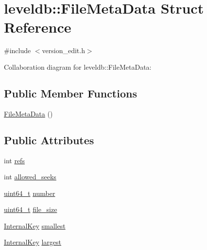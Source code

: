 \hypertarget{structleveldb_1_1_file_meta_data}{\section{leveldb\-:\-:File\-Meta\-Data Struct Reference}
\label{structleveldb_1_1_file_meta_data}
}


{\ttfamily \#include $<$version\-\_\-edit.\-h$>$}



Collaboration diagram for leveldb\-:\-:File\-Meta\-Data\-:
\subsection*{Public Member Functions}
\begin{DoxyCompactItemize}
\item 
\hyperlink{structleveldb_1_1_file_meta_data_ab809d499cd560df58cc5c529bb69980a}{File\-Meta\-Data} ()
\end{DoxyCompactItemize}
\subsection*{Public Attributes}
\begin{DoxyCompactItemize}
\item 
int \hyperlink{structleveldb_1_1_file_meta_data_a199e4ba2167c8facad8bd41269982935}{refs}
\item 
int \hyperlink{structleveldb_1_1_file_meta_data_a63f9a0149290c7b22bbc871da6b4f619}{allowed\-\_\-seeks}
\item 
\hyperlink{stdint_8h_aaa5d1cd013383c889537491c3cfd9aad}{uint64\-\_\-t} \hyperlink{structleveldb_1_1_file_meta_data_adc63bac3e06fd4387ebb9f085fc88fe7}{number}
\item 
\hyperlink{stdint_8h_aaa5d1cd013383c889537491c3cfd9aad}{uint64\-\_\-t} \hyperlink{structleveldb_1_1_file_meta_data_a778ea9c773ad4fdfe4408eecaae754f7}{file\-\_\-size}
\item 
\hyperlink{classleveldb_1_1_internal_key}{Internal\-Key} \hyperlink{structleveldb_1_1_file_meta_data_a9e5e5c149495aede836ac637cd89269f}{smallest}
\item 
\hyperlink{classleveldb_1_1_internal_key}{Internal\-Key} \hyperlink{structleveldb_1_1_file_meta_data_a410718ba1868392b298d05a774dd07d1}{largest}
\end{DoxyCompactItemize}


